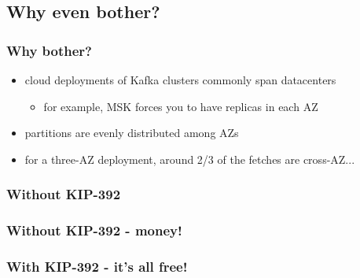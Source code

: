 \documentclass{beamer}
\newcommand{\diagram}[2][1]{
  \begin{center}
    \texttt{[image: \#2]}
  \end{center}
}
\newlength{\wideitemsep}
\let\olditem\item
\renewcommand{\item}{\setlength{\itemsep}{\wideitemsep}\olditem}
\begin{document}
\subsection{Why even bother?}

\begin{frame}
  \frametitle{Why bother?}

  \begin{itemize}
  \item \alert{cloud deployments} of Kafka clusters commonly span datacenters
    \begin{itemize}
    \item for example, MSK forces you to have replicas in \alert{each AZ}
    \end{itemize}
  \item partitions are \alert{evenly distributed} among AZs
  \item for a three-AZ deployment, around 2/3 of the fetches are \alert{cross-AZ}... 
  \end{itemize}
\end{frame}


\begin{frame}[plain]
\end{frame}
\usebackgroundtemplate{}

\begin{frame}
  \frametitle<1>{Without KIP-392}
  \frametitle<2>{Without KIP-392 - money!}
  \frametitle<3>{With KIP-392 - it's all free!}

  \only<1>{\diagram{cross-az-fetch-1}}
  \only<2>{\diagram{cross-az-fetch-2}}
  \only<3>{\diagram{cross-az-fetch-3}}
\end{frame}
\end{document}
